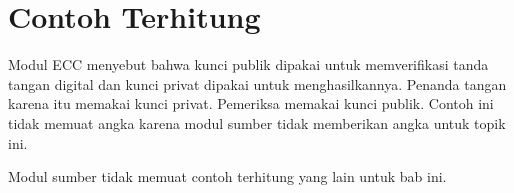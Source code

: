 \section{Contoh Terhitung}

\begin{example}
Modul ECC menyebut bahwa kunci publik dipakai untuk memverifikasi tanda tangan
digital dan kunci privat dipakai untuk menghasilkannya. Penanda tangan karena
itu memakai kunci privat. Pemeriksa memakai kunci publik. Contoh ini tidak
memuat angka karena modul sumber tidak memberikan angka untuk topik ini.
\end{example}

Modul sumber tidak memuat contoh terhitung yang lain untuk bab ini.
